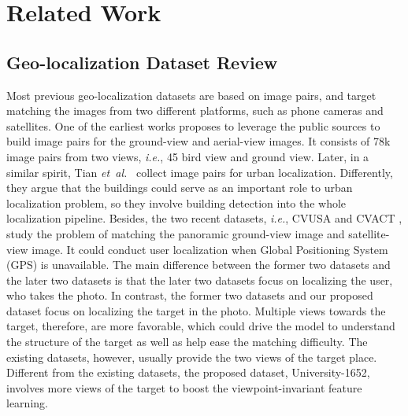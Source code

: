 \documentclass[sigconf]{acmart}
\def\ie{\emph{i.e.}}
\def\etal{\emph{et~al.}}
\begin{document}
\section{Related Work}


\subsection{Geo-localization Dataset Review}
Most previous geo-localization datasets are based on image pairs, and target matching the images from two different platforms, such as phone cameras and satellites. One of the earliest works \cite{lin2015learning} proposes to leverage the public sources to build image pairs for the ground-view and aerial-view images. It consists of 78k image pairs from two views, \ie, 45 bird view and ground view. Later, in a similar spirit, Tian \etal~ \cite{tian2017cross} collect image pairs for urban localization. Differently, they argue that the buildings could serve as an important role to urban localization problem, so they involve building detection into the whole localization pipeline. Besides, the two recent datasets, \ie, CVUSA \cite{zhai2017predicting} and CVACT \cite{liu2019lending}, study the problem of matching the panoramic ground-view image and satellite-view image. It could conduct user localization when Global Positioning System (GPS) is unavailable. The main difference between the former two datasets \cite{lin2015learning, tian2017cross} and the later two datasets \cite{zhai2017predicting,liu2019lending} is that the later two datasets focus on localizing the user, who takes the photo. In contrast, the former two datasets and our proposed dataset focus on localizing the target in the photo. Multiple views towards the target, therefore, are more favorable, which could drive the model to understand the structure of the target as well as help ease the matching difficulty. The existing datasets, however, usually provide the two views of the target place. Different from the existing datasets, the proposed dataset, University-1652, involves more views of the target to boost the viewpoint-invariant feature learning. 
\end{document}
